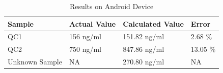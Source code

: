 \documentclass[runningheads,a4paper]{llncs}
\begin{document}
\begin{table}[h!]
\begin{center}
\setlength\tabcolsep{2.5pt}
\def\arraystretch{1.5}
\begin{tabular}{| m{5em} m{7em} m{9em} m{5em} |}
\hline
Sample & Actual Value & Calculated Value & Error\\
\hline
\hline
QC1 & 156 ng/ml & 151.82 ng/ml & 2.68 \%\\
\hline
QC2 & 750 ng/ml & 847.86 ng/ml & 13.05 \%\\
\hline
Unknown Sample & NA & 270.80 ng/ml & NA \\
\hline
\end{tabular}
\\
\caption{Results on Android Device}
\label{table:andresults}
\end{center}
\end{table}
\end{document}

